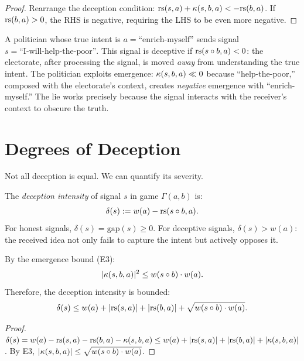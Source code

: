 \begin{proof}
Rearrange the deception condition: $\mathrm{rs}(s,a) + \kappa(s,b,a) < -\mathrm{rs}(b,a)$.
If $\mathrm{rs}(b,a) > 0$, the RHS is negative, requiring the LHS to be even more
negative.
\end{proof}

\begin{example}
A politician whose true intent is $a = \text{``enrich-myself''}$ sends signal
$s = \text{``I-will-help-the-poor''}$. This signal is deceptive if
$\mathrm{rs}(s \circ b, a) < 0$: the electorate, after processing the signal,
is moved \emph{away} from understanding the true intent. The politician
exploits emergence: $\kappa(s, b, a) \ll 0$ because ``help-the-poor,''
composed with the electorate's context, creates \emph{negative} emergence
with ``enrich-myself.'' The lie works precisely because the signal interacts
with the receiver's context to obscure the truth.
\end{example}


\section{Degrees of Deception}

Not all deception is equal. We can quantify its severity.

\begin{definition}
\label{def:deception-intensity}
The \emph{deception intensity} of signal $s$ in game $\Gamma(a, b)$ is:
\[
\delta(s) := w(a) - \mathrm{rs}(s \circ b, a).
\]
For honest signals, $\delta(s) = \mathrm{gap}(s) \geq 0$. For deceptive
signals, $\delta(s) > w(a)$: the received idea not only fails to capture
the intent but actively opposes it.
\end{definition}

\begin{theorem}
\label{thm:deception-bound}
By the emergence bound (E3):
\[
|\kappa(s, b, a)|^2 \leq w(s \circ b) \cdot w(a).
\]
Therefore, the deception intensity is bounded:
\[
\delta(s) \leq w(a) + |\mathrm{rs}(s, a)| + |\mathrm{rs}(b, a)| + \sqrt{w(s \circ b) \cdot w(a)}.
\]
\end{theorem}

\begin{proof}
$\delta(s) = w(a) - \mathrm{rs}(s,a) - \mathrm{rs}(b,a) - \kappa(s,b,a) \leq
w(a) + |\mathrm{rs}(s,a)| + |\mathrm{rs}(b,a)| + |\kappa(s,b,a)|$.
By E3, $|\kappa(s,b,a)| \leq \sqrt{w(s \circ b) \cdot w(a)}$.
\end{proof}

